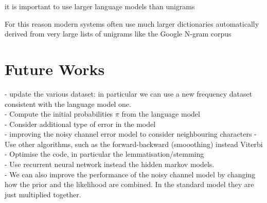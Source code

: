 
it is important to use larger language models than unigrams


For this reason modern systems often use much larger dictionaries automatically derived from very large lists of 
unigrams like the Google N-gram corpus

\section{Future Works}

- update the various dataset: in particular we can use a new frequency dataset consistent with the language model one.\\
- Compute the initial probabilities $\pi$ from the language model\\
- Consider additional type of error in the model\\
- improving the noisy channel error model to consider neighbouring characters
- Use other algorithms, such as the forward-backward (smooothing) instead Viterbi\\
- Optimise the code, in particular the lemmatisation/stemming \\
- Use recurrent neural network instead the hidden markov models.\\
- We can also improve the performance of the noisy channel model by changing how the prior and the likelihood 
are combined. In the standard model they are just multiplied together.

